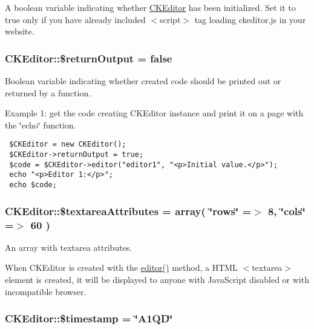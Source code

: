 A boolean variable indicating whether \hyperlink{classCKEditor}{CKEditor} has been initialized. Set it to true only if you have already included $<$script$>$ tag loading ckeditor.js in your website. \hypertarget{classCKEditor_8c1b2e12b69f023e484aab53a960b15c}{
\subsubsection[{\$returnOutput}]{\setlength{\rightskip}{0pt plus 5cm}CKEditor::\$returnOutput = false}}
\label{classCKEditor_8c1b2e12b69f023e484aab53a960b15c}


Boolean variable indicating whether created code should be printed out or returned by a function.

Example 1: get the code creating CKEditor instance and print it on a page with the \char`\"{}echo\char`\"{} function. 

\begin{Code}\begin{verbatim} $CKEditor = new CKEditor();
 $CKEditor->returnOutput = true;
 $code = $CKEditor->editor("editor1", "<p>Initial value.</p>");
 echo "<p>Editor 1:</p>";
 echo $code;
\end{verbatim}
\end{Code}

 \hypertarget{classCKEditor_98970663df037c33f4841cbfbe38e5f9}{
\subsubsection[{\$textareaAttributes}]{\setlength{\rightskip}{0pt plus 5cm}CKEditor::\$textareaAttributes = array( \char`\"{}rows\char`\"{} =$>$ 8, \char`\"{}cols\char`\"{} =$>$ 60 )}}
\label{classCKEditor_98970663df037c33f4841cbfbe38e5f9}


An array with textarea attributes.

When CKEditor is created with the \hyperlink{classCKEditor_bd6f81ca7539169b55b8f0556bc594c6}{editor()} method, a HTML $<$textarea$>$ element is created, it will be displayed to anyone with JavaScript disabled or with incompatible browser. \hypertarget{classCKEditor_6c4f7cd772f7ae66a405ad2d54c33125}{
\subsubsection[{\$timestamp}]{\setlength{\rightskip}{0pt plus 5cm}CKEditor::\${\bf timestamp} = \char`\"{}A1QD\char`\"{}}}
\label{classCKEditor_6c4f7cd772f7ae66a405ad2d54c33125}


